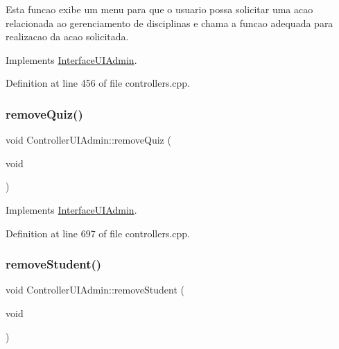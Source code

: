 Esta funcao exibe um menu para que o usuario possa solicitar uma acao relacionada ao gerenciamento de disciplinas e chama a funcao adequada para realizacao da acao solicitada. 

Implements \hyperlink{class_interface_u_i_admin_ac5c6b8b3eb80b5f5d401b711da4ecc58}{Interface\+U\+I\+Admin}.



Definition at line 456 of file controllers.\+cpp.

\mbox{\label{class_controller_u_i_admin_aeb774e2a137c65593cbe4c3ed22ffe64}} 
\subsubsection{\texorpdfstring{remove\+Quiz()}{removeQuiz()}}
{\footnotesize\ttfamily void Controller\+U\+I\+Admin\+::remove\+Quiz (\begin{DoxyParamCaption}\item[{void}]{ }\end{DoxyParamCaption})\hspace{0.3cm}{\ttfamily [virtual]}}



Implements \hyperlink{class_interface_u_i_admin_ae092dea900f7b2bc57cbf82b665df0ce}{Interface\+U\+I\+Admin}.



Definition at line 697 of file controllers.\+cpp.

\mbox{\label{class_controller_u_i_admin_a4487c7bf31acf5637e15e62af131b550}} 
\subsubsection{\texorpdfstring{remove\+Student()}{removeStudent()}}
{\footnotesize\ttfamily void Controller\+U\+I\+Admin\+::remove\+Student (\begin{DoxyParamCaption}\item[{void}]{ }\end{DoxyParamCaption})\hspace{0.3cm}{\ttfamily [virtual]}}

